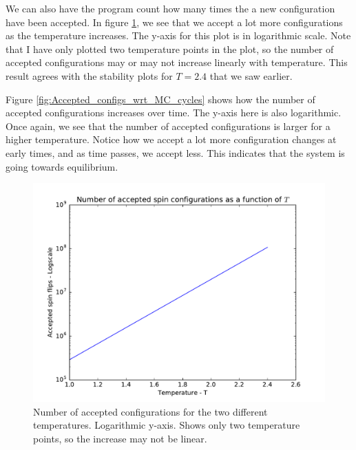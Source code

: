 \documentclass[12pt]{article}
\begin{document}
We can also have the program count how many times the a new configuration have been accepted. In figure \ref{fig:Accepted_configs_wrt_temp}, we see that we accept a lot more configurations as the temperature increases. The y-axis for this plot is in logarithmic scale. Note that I have only plotted two temperature points in the plot, so the number of accepted configurations may or may not increase linearly with temperature. This result agrees with the stability plots for $T=2.4$ that we saw earlier. 

Figure \ref{fig:Accepted_configs_wrt_MC_cycles} shows how the number of accepted configurations increases over time. The y-axis here is also logarithmic. Once again, we see that the number of accepted configurations is larger for a higher temperature. Notice how we accept a lot more configuration changes at early times, and as time passes, we accept less. This indicates that the system is going towards equilibrium. 

\begin{figure}[H]
\centering
\includegraphics[width=\linewidth]{Plots/Accepted_configs_wrt_temp.pdf}
\caption{Number of accepted configurations for the two different temperatures. Logarithmic y-axis. Shows only two temperature points, so the increase may not be linear.}
\label{fig:Accepted_configs_wrt_temp}
\end{figure}
\end{document}
